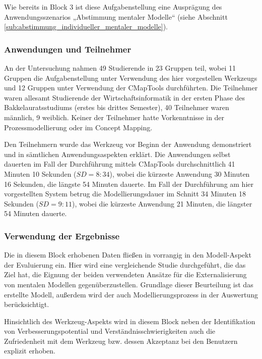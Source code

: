 Wie bereits in Block 3 ist diese Aufgabenstellung eine Ausprägung des Anwendungsszenarios „Abstimmung mentaler Modelle“ (siehe Abschnitt \ref{sub:abstimmung_individueller_mentaler_modelle}).


\subsubsection{Anwendungen und Teilnehmer} %
\label{ssub:5_teilnehmer}

An der Untersuchung nahmen 49 Studierende in 23 Gruppen teil, wobei 11 Gruppen die Aufgabenstellung unter Verwendung des hier vorgestellen Werkzeugs und 12 Gruppen unter Verwendung der CMapTools durchführten. Die Teilnehmer waren allesamt Studierende der Wirtschaftsinformatik in der ersten Phase des Bakkelauratsstudiums (erstes bis drittes Semester), 40 Teilnehmer waren männlich, 9 weiblich. Keiner der Teilnehmer hatte Vorkenntnisse in der Prozessmodellierung oder im Concept Mapping.

Den Teilnehmern wurde das Werkzeug vor Beginn der Anwendung demonstriert und in sämtlichen Anwendungsaspekten erklärt. Die Anwendungen selbst dauerten im Fall der Durchführung mittels CMapTools durchschnittlich 41 Minuten 10 Sekunden ($SD=8:34$), wobei die kürzeste Anwendung 30 Minuten 16 Sekunden, die längste 54 Minuten dauerte. Im Fall der Durchführung am hier vorgestellten System betrug die Modellierungsdauer im Schnitt 34 Minuten 18 Sekunden ($SD=9:11$), wobei die kürzeste Anwendung 21 Minuten, die längster 54 Minuten dauerte.


\subsubsection{Verwendung der Ergebnisse} %
\label{ssub:5_verwendung_der_ergebnisse}

Die in diesem Block erhobenen Daten fließen in vorrangig in den Modell-Aspekt der Evaluierung ein. Hier wird eine vergleichende Studie durchgeführt, die das Ziel hat, die Eignung der beiden verwendeten Ansätze für die Externalisierung von mentalen Modellen gegenüberzustellen. Grundlage dieser Beurteilung ist das erstellte Modell, außerdem wird der auch Modellierungsprozess in der Auswertung berücksichtigt.

Hinsichtlich des Werkzeug-Aspekts wird in diesem Block neben der Identifikation von Verbesserungspotential und Verständnisschwierigkeiten auch die Zufriedenheit mit dem Werkzeug bzw. dessen Akzeptanz bei den Benutzern explizit erhoben. 

